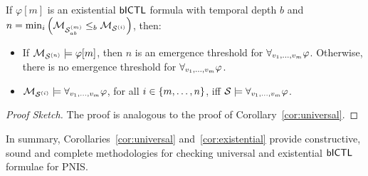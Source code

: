 \begin{corollary}
\label{cor:existential}
If $\varphi[m]$ is an existential $\sf{bICTL}$ formula with temporal depth $b$ and  $n
= \min_i \left( \mathcal{M}_{\mathcal{S}_{ab}^{(m)}} \leq_b \mathcal{M}_{\mathcal{S}^{(i)}} \right)$, then:
\begin{itemize}[$\bullet$]
\item If $\mathcal{M}_{\mathcal{S}^{(n)}} \models \varphi[m]$, then $n$ is an emergence threshold for
$\forall_{v_1,\ldots,v_m} \varphi$. Otherwise, there is no emergence threshold for $\forall_{v_1,\ldots,v_m} \varphi$.

\item $\mathcal{M}_{\mathcal{S}^{(i)}} \models \forall_{v_1,\ldots,v_m} \varphi$, for all $i \in \left \{ m, \ldots, n \right \}$, iff
$\mathcal S \models \forall_{v_1,\ldots,v_m} \varphi$.
\end{itemize}
\end{corollary}

 \begin{proof}[Proof Sketch]
     The proof is analogous to the proof of Corollary~\ref{cor:universal}.
 \end{proof}

In summary, Corollaries~\ref{cor:universal} and~\ref{cor:existential} provide
constructive, sound and complete methodologies for checking universal and 
existential $\sf{bICTL}$ formulae for PNIS.  

